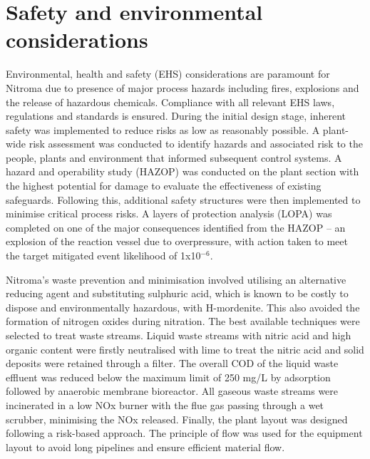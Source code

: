 \section*{Safety and environmental considerations}

Environmental, health and safety (EHS) considerations are paramount for Nitroma due to presence of major process hazards including fires, explosions and the release of hazardous chemicals. Compliance with all relevant EHS laws, regulations and standards is ensured.  During the initial design stage, inherent safety was implemented to reduce risks as low as reasonably possible. A plant-wide risk assessment was conducted to identify hazards and associated risk to the people, plants and environment that informed subsequent control systems. A hazard and operability study (HAZOP) was conducted on the plant section with the highest potential for damage to evaluate the effectiveness of existing safeguards. Following this, additional safety structures were then implemented to minimise critical process risks. A layers of protection analysis (LOPA) was completed on one of the major consequences identified from the HAZOP – an explosion of the reaction vessel due to overpressure, with action taken to meet the target mitigated event likelihood of 1x10$^{-6}$.  

Nitroma's waste prevention and minimisation involved utilising an alternative reducing agent and substituting sulphuric acid, which is known to be costly to dispose and environmentally hazardous, with H-mordenite. This also avoided the formation of nitrogen oxides during nitration. The best available techniques  were selected to treat waste streams. Liquid waste streams with nitric acid and high organic content were firstly neutralised with lime to treat the nitric acid and solid deposits were retained through a filter. The overall COD of the liquid waste effluent was reduced below the maximum limit of 250 mg/L by adsorption followed by anaerobic membrane bioreactor. All gaseous waste streams were incinerated in a low NOx burner with the flue gas passing through a wet scrubber, minimising the NOx released. Finally, the plant layout was designed following a risk-based approach. The principle of flow was used for the equipment layout to avoid long pipelines and ensure efficient material flow. 